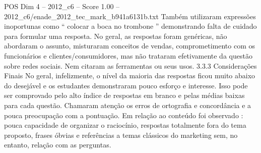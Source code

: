 \begin{textsample}{POS Dim 4 – 2012\_c6 – Score 1.00 – 2012\_c6/enade\_2012\_tec\_mark\_b941a6131b.txt}
Também utilizaram expressões inoportunas como “ colocar a boca no trombone ” demonstrando falta de cuidado para formular uma resposta.
No geral, as respostas foram genéricas, não abordaram o assunto, misturaram conceitos de vendas, comprometimento com os funcionários e clientes/consumidores, mas não trataram efetivamente da questão sobre redes sociais.
Nem citaram as ferramentas ou seus usos. 3.3.3 Considerações Finais No geral, infelizmente, o nível da maioria das respostas ficou muito abaixo do desejável e os estudantes demonstraram pouco esforço e interesse.
Isso pode ser comprovado pelo alto índice de respostas em branco e pelas médias baixas para cada questão.
Chamaram atenção os erros de ortografia e concordância e a pouca preocupação com a pontuação.
Em relação ao conteúdo foi observado : pouca capacidade de organizar o raciocínio, respostas totalmente fora do tema proposto, frases óbvias e referências a temas clássicos do marketing sem, no entanto, relação com as perguntas.

\end{textsample}

